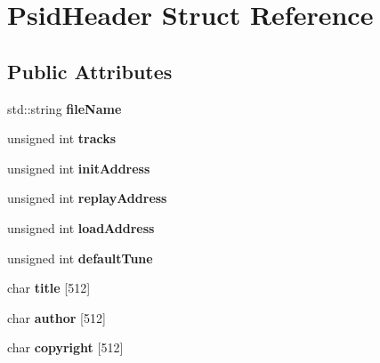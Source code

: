 \hypertarget{struct_psid_header}{}\section{Psid\+Header Struct Reference}
\label{struct_psid_header}
\subsection*{Public Attributes}
\begin{DoxyCompactItemize}
\item 
\mbox{\label{struct_psid_header_ae574a25a924189fd06e38c56d4f8ed38}} 
std\+::string {\bfseries file\+Name}
\item 
\mbox{\label{struct_psid_header_a1d480c412f1935fb81ff67256157ddd2}} 
unsigned int {\bfseries tracks}
\item 
\mbox{\label{struct_psid_header_a34adafee38be8a44e01a5fee0c225047}} 
unsigned int {\bfseries init\+Address}
\item 
\mbox{\label{struct_psid_header_a52426e0a7ba1cf4bb97459263e52df0c}} 
unsigned int {\bfseries replay\+Address}
\item 
\mbox{\label{struct_psid_header_a2d1f54a6513421eca4091b55032a8268}} 
unsigned int {\bfseries load\+Address}
\item 
\mbox{\label{struct_psid_header_a1a9d20d410173206d34f8620c607e871}} 
unsigned int {\bfseries default\+Tune}
\item 
\mbox{\label{struct_psid_header_aec4895bf8d4962b0e773d24e6318d426}} 
char {\bfseries title} \mbox{[}512\mbox{]}
\item 
\mbox{\label{struct_psid_header_aacb16a1d4b3e4eac31afb08fbea36935}} 
char {\bfseries author} \mbox{[}512\mbox{]}
\item 
\mbox{\label{struct_psid_header_a1b1bd2fc6f2df96740e10573bc8147c8}} 
char {\bfseries copyright} \mbox{[}512\mbox{]}
\item 
\mbox{\label{struct_psid_header_a7c9671b0f8665bec810c19956cbd2d10}} 

\end{DoxyCompactItemize}
